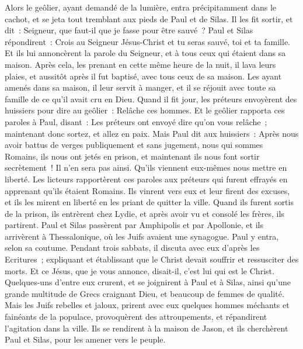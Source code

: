 \begin{multicols}{2}
Alors le geôlier, ayant demandé de la lumière, entra précipitamment dans le cachot, et se jeta tout tremblant aux pieds de Paul et de Silas.
Il les fit sortir, et dit~: Seigneur, que faut-il que je fasse pour être sauvé~?
Paul et Silas répondirent~: Crois au Seigneur Jésus-Christ et tu seras sauvé, toi et ta famille.
Et ils lui annoncèrent la parole du Seigneur, et à tous ceux qui étaient dans sa maison.
Après cela, les prenant en cette même heure de la nuit, il lava leurs plaies, et aussitôt après il fut baptisé, avec tous ceux de sa maison.
Les ayant amenés dans sa maison, il leur servit à manger, et il se réjouit avec toute sa famille de ce qu'il avait cru en Dieu.
Quand il fit jour, les préteurs envoyèrent des huissiers pour dire au geôlier~: Relâche ces hommes.
Et le geôlier rapporta ces paroles à Paul, disant~: Les préteurs ont envoyé dire qu'on vous relâche~; maintenant donc sortez, et allez en paix.
Mais Paul dit aux huissiers~: Après nous avoir battus de verges publiquement et sans jugement, nous qui sommes Romains, ils nous ont jetés en prison, et maintenant ils nous font sortir secrètement~! Il n'en sera pas ainsi. Qu'ils viennent eux-mêmes nous mettre en liberté.
Les licteurs rapportèrent ces paroles aux préteurs qui furent effrayés en apprenant qu'ils étaient Romains.
Ils vinrent vers eux et leur firent des excuses, et ils les mirent en liberté en les priant de quitter la ville.
Quand ils furent sortis de la prison, ils entrèrent chez Lydie, et après avoir vu et consolé les frères, ils partirent.
\VerseOne{}Paul et Silas passèrent par Amphipolis et par Apollonie, et ils arrivèrent à Thessalonique, où les Juifs avaient une synagogue.
Paul y entra, selon sa coutume. Pendant trois sabbats, il discuta avec eux d'après les Ecritures~;
expliquant et établissant que le Christ devait souffrir et ressusciter des morts. Et ce Jésus, que je vous annonce, disait-il, c'est lui qui est le Christ.
Quelques-uns d'entre eux crurent, et se joignirent à Paul et à Silas, ainsi qu'une grande multitude de Grecs craignant Dieu, et beaucoup de femmes de qualité.
Mais les Juifs rebelles et jaloux, prirent avec eux quelques hommes méchants et fainéants de la populace, provoquèrent des attroupements, et répandirent l'agitation dans la ville. Ils se rendirent à la maison de Jason, et ils cherchèrent Paul et Silas, pour les amener vers le peuple.

\end{multicols}
